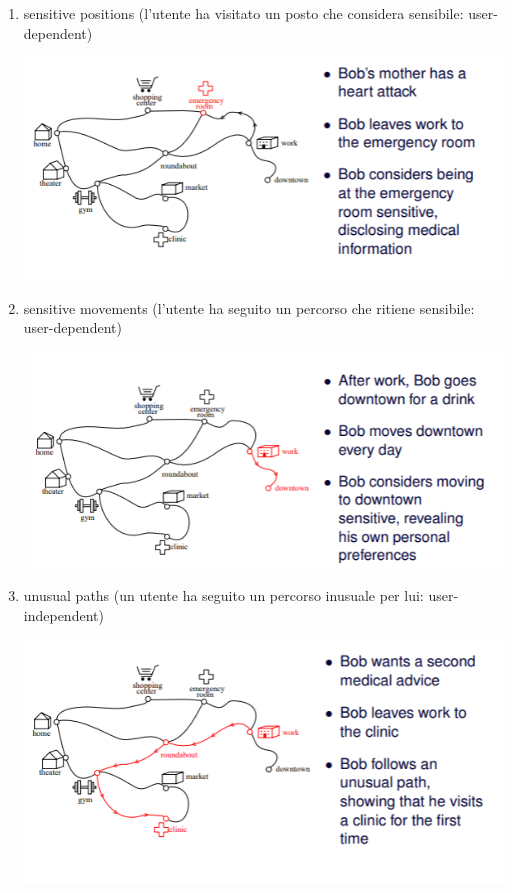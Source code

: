 \begin{enumerate}
    \item sensitive positions (l'utente ha visitato un posto che considera sensibile: user-dependent)
        \begin{center}
    \includegraphics[scale=0.7]{img/senspos.png}
\end{center}
    \item sensitive movements (l'utente ha seguito un percorso che ritiene sensibile: user-dependent)
        \begin{center}
    \includegraphics[scale=0.7]{img/sensmov.png}
\end{center}
    \item unusual paths (un utente ha seguito un percorso inusuale per lui: user-independent)
        \begin{center}
    \includegraphics[scale=0.7]{img/unusualpath.png}
\end{center}
\end{enumerate}
